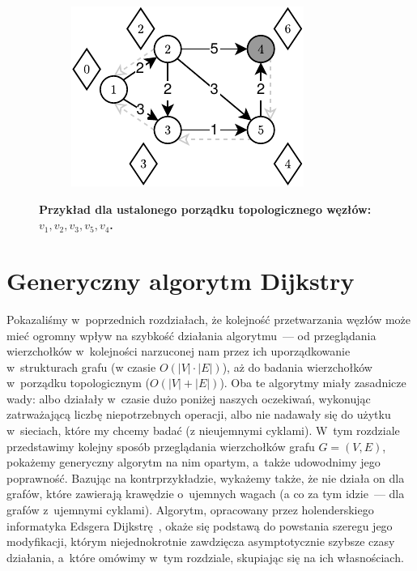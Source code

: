 \begin{figure}[!htbp]
\begin{subfigure}[b]{0.18\textwidth}
		\includegraphics[width=\textwidth]{Chapter_II/TOPOLOGIC-SHORTEST-PATH-Example/e.pdf}
		\caption{}
	\end{subfigure}
	\caption{\textbf{Przykład dla ustalonego porządku topologicznego węzłów: $v_{1}, v_{2}, v_{3}, v_{5}, v_{4}$.}} \label{fig:exampleTopologicalShotrestPath}
\end{figure}

\newpage
\section{Generyczny algorytm Dijkstry}
\label{sec:dijkstraGenericAlgorithm}

Pokazaliśmy w~poprzednich rozdziałach, że kolejność przetwarzania węzłów może mieć ogromny wpływ na szybkość działania algorytmu~--- od przeglądania wierzchołków w~kolejności narzuconej nam przez ich uporządkowanie w~strukturach grafu (w czasie $ O \left( \left| V \right| \cdot \left| E \right| \right)$), aż do badania wierzchołków w~porządku topologicznym ($ O \left( \left| V \right| + \left| E \right| \right)$). Oba te algorytmy miały zasadnicze wady: albo działały w~czasie dużo poniżej naszych oczekiwań, wykonując zatrważającą liczbę niepotrzebnych operacji, albo nie nadawały się do użytku w~sieciach, które my chcemy badać (z nieujemnymi cyklami). W~tym rozdziale przedstawimy kolejny sposób przeglądania wierzchołków grafu $G = \left( V, E \right)$, pokażemy generyczny algorytm na nim opartym, a~także udowodnimy jego poprawność. Bazując na kontrprzykładzie, wykażemy także, że nie działa on dla grafów, które zawierają krawędzie o~ujemnych wagach (a co za tym idzie~--- dla grafów z~ujemnymi cyklami). Algorytm, opracowany przez holenderskiego informatyka Edsgera Dijkstrę~\cite[$4.5$]{Ahuja:1993:NFT:137406}, okaże się podstawą do powstania szeregu jego modyfikacji, którym niejednokrotnie zawdzięcza asymptotycznie szybsze czasy działania, a~które omówimy w~tym rozdziale, skupiając się na ich własnościach.

